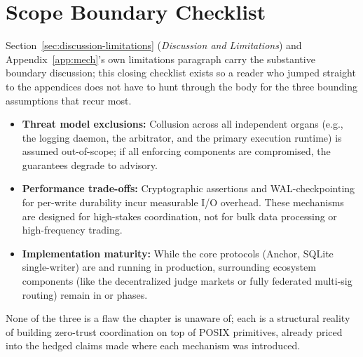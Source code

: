 \documentclass[11pt,a4paper]{article}
\theoremstyle{definition}
\theoremstyle{remark}
\begin{document}
\section{Scope Boundary Checklist}\label{sec:bonded-limitations-boundaries}

Section~\ref{sec:discussion-limitations} (\emph{Discussion and Limitations}) and Appendix~\ref{app:mech}'s own limitations paragraph carry the substantive boundary discussion; this closing checklist exists so a reader who jumped straight to the appendices does not have to hunt through the body for the three bounding assumptions that recur most.

\begin{itemize}
    \item \textbf{Threat model exclusions:} Collusion across all independent organs (e.g., the logging daemon, the arbitrator, and the primary execution runtime) is assumed out-of-scope; if all enforcing components are compromised, the guarantees degrade to advisory.
    \item \textbf{Performance trade-offs:} Cryptographic assertions and WAL-checkpointing for per-write durability incur measurable I/O overhead. These mechanisms are designed for high-stakes coordination, not for bulk data processing or high-frequency trading.
    \item \textbf{Implementation maturity:} While the core protocols (Anchor, SQLite single-writer) are  and running in production, surrounding ecosystem components (like the decentralized judge markets or fully federated multi-sig routing) remain in  or  phases.
\end{itemize}

None of the three is a flaw the chapter is unaware of; each is a structural reality of building zero-trust coordination on top of POSIX primitives, already priced into the hedged claims made where each mechanism was introduced.
\end{document}
